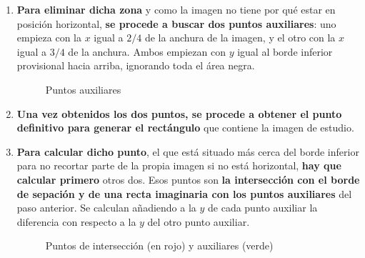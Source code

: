 \begin{enumerate}
\begin{enumerate}[label*=\arabic*.]
    \begin{enumerate}[label*=\arabic*.]
    \item \textbf{Para eliminar dicha zona} y como la imagen no tiene
      por qué estar en posición horizontal, \textbf{se procede a
        buscar dos puntos auxiliares}: uno empieza con la $x$ igual a
      $2/4$ de la anchura de la imagen, y el otro con la $x$ igual a
      $3/4$ de la anchura. Ambos empiezan con $y$ igual al borde
      inferior provisional hacia arriba, ignorando toda el área negra.

      \begin{figure}[H]
        \caption{Puntos auxiliares}
        \centering \setlength\fboxsep{0pt} \setlength\fboxrule{0.5pt}
      \end{figure}

    \item \textbf{Una vez obtenidos los dos puntos, se procede a
        obtener el punto definitivo para generar el rectángulo} que
      contiene la imagen de estudio.

    \item \textbf{Para calcular dicho punto}, el que está situado más
      cerca del borde inferior para no recortar parte de la propia
      imagen si no está horizontal, \textbf{hay que calcular primero}
      otros dos. Esos puntos son \textbf{la intersección con el borde
        de sepación y de una recta imaginaria con los puntos
        auxiliares} del paso anterior. Se calculan añadiendo a la $y$
      de cada punto auxiliar la diferencia con respecto a la $y$ del
      otro punto auxiliar.

      \begin{figure}[H]
        \caption{Puntos de intersección (en rojo) y auxiliares
          (verde)}
        \centering \setlength\fboxsep{0pt} \setlength\fboxrule{0.5pt}
      \end{figure}


\end{enumerate}
\end{enumerate}
\end{enumerate}
